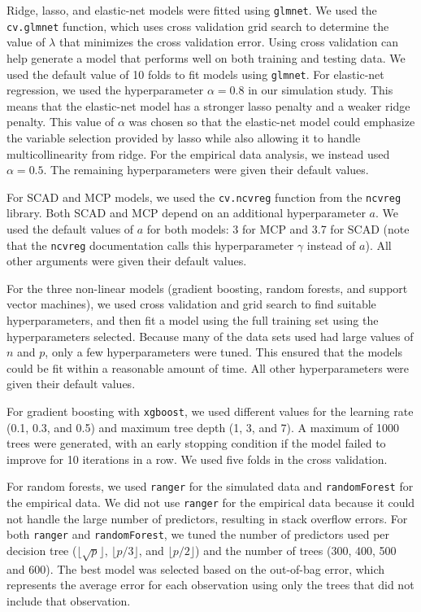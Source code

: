 \documentclass{article}
\begin{document}
	Ridge, lasso, and elastic-net models were fitted using \lstinline!glmnet!. We used the \lstinline!cv.glmnet! function, which uses cross validation grid search to determine the value of $\lambda$ that minimizes the cross validation error. Using cross validation can help generate a model that performs well on both training and testing data. We used the default value of 10 folds to fit models using \lstinline!glmnet!. For elastic-net regression, we used the hyperparameter $\alpha = 0.8$ in our simulation study. This means that the elastic-net model has a stronger lasso penalty and a weaker ridge penalty. This value of $\alpha$ was chosen so that the elastic-net model could emphasize the variable selection provided by lasso while also allowing it to handle multicollinearity from ridge. For the empirical data analysis, we instead used $\alpha = 0.5$. The remaining hyperparameters were given their default values.
	
	For SCAD and MCP models, we used the \lstinline!cv.ncvreg! function from the \lstinline!ncvreg! library. Both SCAD and MCP depend on an additional hyperparameter $a$. We used the default values of $a$ for both models: 3 for MCP and 3.7 for SCAD (note that the \lstinline!ncvreg! documentation calls this hyperparameter $\gamma$ instead of $a$). All other arguments were given their default values. 
	
	For the three non-linear models (gradient boosting, random forests, and support vector machines), we used cross validation and grid search to find suitable hyperparameters, and then fit a model using the full training set using the hyperparameters selected. Because many of the data sets used had large values of $n$ and $p$, only a few hyperparameters were tuned. This ensured that the models could be fit within a reasonable amount of time. All other hyperparameters were given their default values.
	
	For gradient boosting with \lstinline!xgboost!, we used different values for the learning rate (0.1, 0.3, and 0.5) and maximum tree depth (1, 3, and 7). A maximum of 1000 trees were generated, with an early stopping condition if the model failed to improve for 10 iterations in a row. We used five folds in the cross validation.
	
	For random forests, we used \lstinline!ranger! for the simulated data and \lstinline!randomForest! for the empirical data. We did not use \lstinline!ranger! for the empirical data because it could not handle the large number of predictors, resulting in stack overflow errors. For both \lstinline!ranger! and \lstinline!randomForest!, we tuned the number of predictors used per decision tree ($\lfloor \sqrt{p}\rfloor$, $\lfloor p / 3 \rfloor$, and $\lfloor p / 2 \rfloor$) and the number of trees (300, 400, 500 and 600). The best model was selected based on the out-of-bag error, which represents the average error for each observation using only the trees that did not include that observation.
	
\end{document}
